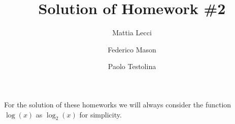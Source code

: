 \documentclass[12pt]{article}
\title{Solution of Homework \#2}
\author{Mattia Lecci \and Federico Mason \and Paolo Testolina}
\date{}
\numberwithin{equation}{section}
\begin{document}
\maketitle
\thispagestyle{fancyplain}
\flushleft


\justify
For the solution of these homeworks we will always consider the function $\log(x)$ as $\log_2(x)$ for simplicity.








\end{document}
